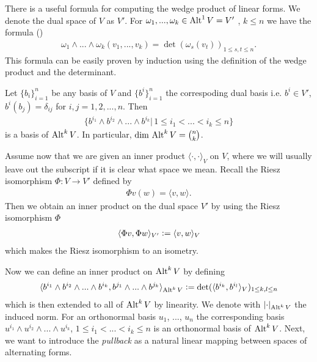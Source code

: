 \documentclass[../main.tex]{subfiles}
\begin{document}
There is a useful formula for computing the wedge product of linear forms.
We denote the dual space of $V$ as $V'$.
For  $\omega_1,...,\omega_k \in {\text{Alt}^{1}\,V} = V'$
, $k \leq n$ we have the formula (\cite[p.260]{topology_and_geometry})
\begin{align}
    \omega_1 \wedge ... \wedge \omega_k (v_1,...,v_k)
    = \det (\omega_s(v_t))_{1\leq s,t \leq n}. 
    \label{eq:wedge_product_of_one_forms}
\end{align}
This formula can be easily proven by induction using the definition of the 
wedge product and the determinant.

Let $\{ b_i\}_{i=1}^n$ be any basis of $V$ and $\{ b^i\}_{i=1}^n$ the 
correspoding dual basis i.e. 
$b^i \in V'$, $b^i(b_j) = \delta_{ij}$ for $i,j = 1,2,..., n$. Then 
\begin{align*}
    \{b^{i_1} \wedge b^{i_2} \wedge ... \wedge b^{i_k} | \, 
    1 \leq i_1 < ... < i_k \leq n \}
\end{align*}
is a basis of ${\text{Alt}^{k}\,V}$. In particular, 
$\dim\, {\text{Alt}^{k}\,V} = \binom{n}{k}$.

Assume now that we are given an inner product $\langle \cdot, \cdot \rangle_V$ on $V$, 
where we will usually leave out the 
subscript if it is clear what space we mean.
Recall the Riesz isomorphism $\Phi: V \rightarrow V'$ defined by
\begin{align*}
    \Phi v (w) = \langle v, w \rangle.
\end{align*}
Then we obtain an inner 
product on the dual space $V'$ by using the Riesz isomorphism $\Phi$ 
\begin{align*}
    \langle \Phi v, \Phi w \rangle_{V'} \vcentcolon= \langle v, w \rangle_V
\end{align*}
which makes the Riesz isomorphism to an isometry.

Now we can define an inner product on ${\text{Alt}^{k}\,V}$ by defining
\begin{align}
    \langle b^{i_1} \wedge b^{i_2} \wedge... \wedge b^{i_k}, 
    b^{j_1} \wedge... \wedge b^{j_k} \rangle_{{\text{Alt}^{k}\,V}} 
    \vcentcolon= \det  ( \langle b^{i_k}, b^{i_l} \rangle_V )_
    {1\leq k,l \leq n} \label{eq:inner_product_alternating_forms}
\end{align}
which is then extended to all of ${\text{Alt}^{k}\,V}$ by linearity. 
We denote with $\lvert \cdot \rvert _{\text{Alt}^{k}\,V}$ the induced norm.
For an orthonormal basis 
$u_1$, ..., $u_n$ the corresponding basis 
$u^{i_1} \wedge u^{i_2} \wedge ... \wedge u^{i_k}$, 
$1\leq i_1 < ... < i_k \leq n$ is an orthonormal basis of ${\text{Alt}^{k}\,V}$.
Next, we want to introduce the \textit{pullback} as a natural linear
mapping between spaces of alternating forms. 
\end{document}
